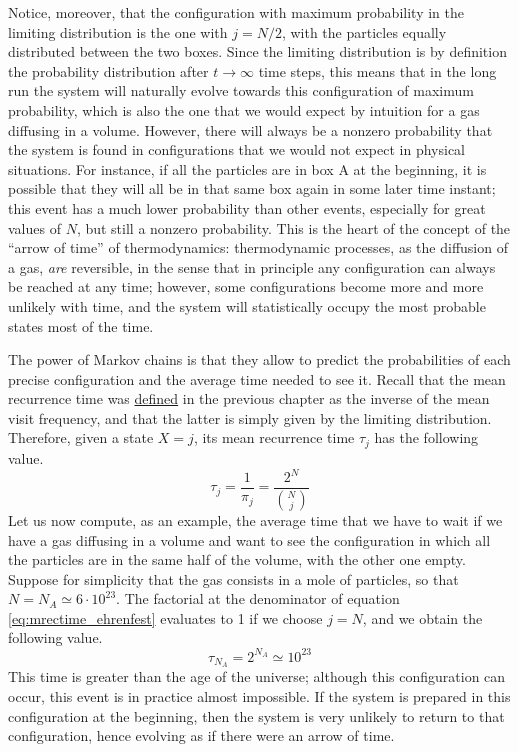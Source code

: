 Notice, moreover, that the configuration with maximum probability in the limiting distribution is the one with $j = N/2$, \ie with the particles equally distributed between the two boxes. Since the limiting distribution is by definition the probability distribution after $t\rightarrow \infty$ time steps, this means that in the long run the system will naturally evolve towards this configuration of maximum probability, which is also the one that we would expect by intuition for a gas diffusing in a volume. However, there will always be a nonzero probability that the system is found in configurations that we would not expect in physical situations. For instance, if all the particles are in box A at the beginning, it is possible that they will all be in that same box again in some later time instant; this event has a much lower probability than other events, especially for great values of $N$, but still a nonzero probability. This is the heart of the concept of the \enquote{arrow of time} of thermodynamics: thermodynamic processes, as the diffusion of a gas, \emph{are} reversible, in the sense that in principle any configuration can always be reached at any time; however, some configurations become more and more unlikely with time, and the system will statistically occupy the most probable states most of the time. 

The power of Markov chains is that they allow to predict the probabilities of each precise configuration and the average time needed to see it. Recall that the mean recurrence time was \hyperref[def:mean_rec_time] {defined} in the previous chapter as the inverse of the mean visit frequency, and that the latter is simply given by the limiting distribution. Therefore, given a state $X = j$, its mean recurrence time $\tau_j$ has the following value.
\begin{equation} \label{eq:mrectime_ehrenfest}
    \tau_j = \frac{1}{\pi_j} = \frac{2^N}{{{N} \choose {j}}} 
\end{equation}
Let us now compute, as an example, the average time that we have to wait if we have a gas diffusing in a volume and want to see the configuration in which all the particles are in the same half of the volume, with the other one empty. Suppose for simplicity that the gas consists in a mole of particles, so that $N = N_A \simeq 6\cdot 10^{23}$. The factorial at the denominator of equation \ref{eq:mrectime_ehrenfest} evaluates to 1 if we choose $j = N$, and we obtain the following value.
\begin{equation}
    \tau_{N_A} = 2^{N_A} \simeq 10^{23}
\end{equation}
This time is greater than the age of the universe; although this configuration can occur, this event is in practice almost impossible. If the system is prepared in this configuration at the beginning, then the system is very unlikely to return to that configuration, hence evolving as if there were an arrow of time.